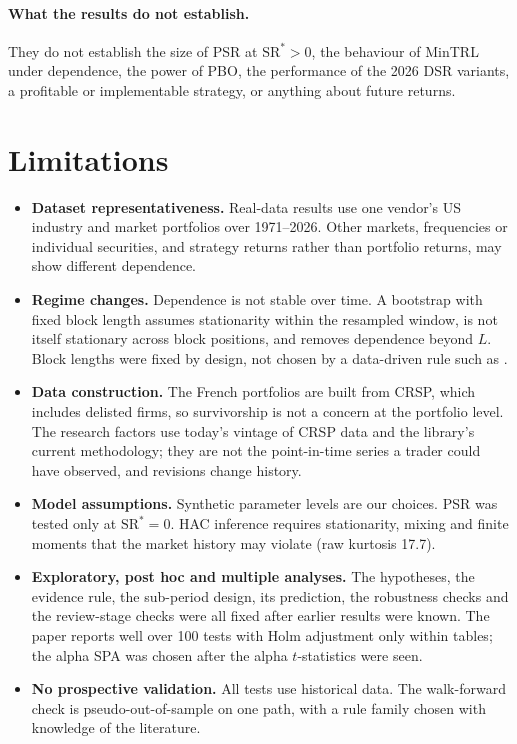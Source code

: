 \documentclass[11pt,a4paper]{article}
\newcommand{\SR}{\mathrm{SR}}
\begin{document}
\paragraph{What the results do not establish.} They do not establish the size of PSR at $\SR^\ast>0$, the behaviour of MinTRL under dependence, the power of PBO, the performance of the 2026 DSR variants, a profitable or implementable strategy, or anything about future returns.

\section{Limitations}\label{sec:limits}

\begin{itemize}
\item \textbf{Dataset representativeness.} Real-data results use one vendor's US industry and market portfolios over 1971--2026. Other markets, frequencies or individual securities, and strategy returns rather than portfolio returns, may show different dependence.
\item \textbf{Regime changes.} Dependence is not stable over time. A bootstrap with fixed block length assumes stationarity within the resampled window, is not itself stationary across block positions, and removes dependence beyond $L$. Block lengths were fixed by design, not chosen by a data-driven rule such as \citet{politis2004}.
\item \textbf{Data construction.} The French portfolios are built from CRSP, which includes delisted firms, so survivorship is not a concern at the portfolio level. The research factors use today's vintage of CRSP data and the library's current methodology; they are not the point-in-time series a trader could have observed, and revisions change history.
\item \textbf{Model assumptions.} Synthetic parameter levels are our choices. PSR was tested only at $\SR^\ast=0$. HAC inference requires stationarity, mixing and finite moments that the market history may violate (raw kurtosis 17.7).
\item \textbf{Exploratory, post hoc and multiple analyses.} The hypotheses, the evidence rule, the sub-period design, its prediction, the robustness checks and the review-stage checks were all fixed after earlier results were known. The paper reports well over 100 tests with Holm adjustment only within tables; the alpha SPA was chosen after the alpha $t$-statistics were seen.
\item \textbf{No prospective validation.} All tests use historical data. The walk-forward check is pseudo-out-of-sample on one path, with a rule family chosen with knowledge of the literature.

\end{itemize}
\end{document}
